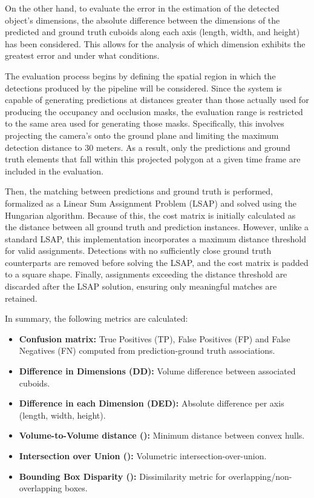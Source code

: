 On the other hand, to evaluate the error in the estimation of the detected object's dimensions, the absolute difference between the dimensions of the predicted and ground truth cuboids along each axis (length, width, and height) has been considered. This allows for the analysis of which dimension exhibits the greatest error and under what conditions.

The evaluation process begins by defining the spatial region in which the detections produced by the pipeline will be considered. Since the system is capable of generating predictions at distances greater than those actually used for producing the  occupancy and occlusion masks, the evaluation range is restricted to the same area used for generating those masks. Specifically, this involves projecting the camera's  onto the ground plane and limiting the maximum detection distance to $30$ meters. As a result, only the predictions and ground truth elements that fall within this projected polygon at a given time frame are included in the evaluation.

Then, the matching between predictions and ground truth is performed, formalized as a Linear Sum Assignment Problem (LSAP) and solved using the Hungarian algorithm. Because of this, the cost matrix is initially calculated as the  distance between all ground truth and prediction instances.  However, unlike a standard LSAP, this implementation incorporates a maximum distance threshold for valid assignments. Detections with no sufficiently close ground truth counterparts are removed before solving the LSAP, and the cost matrix is padded to a square shape. Finally, assignments exceeding the distance threshold are discarded after the LSAP solution, ensuring only meaningful matches are retained. 

In summary, the following metrics are calculated:
\begin{itemize}
    \item \textbf{Confusion matrix:} True Positives (TP), False Positives (FP) and False Negatives (FN) computed from prediction-ground truth associations.
    \item \textbf{Difference in Dimensions (DD):} Volume difference between associated cuboids.
    \item \textbf{Difference in each Dimension (DED):} Absolute difference per axis (length, width, height).  
    \item \textbf{Volume-to-Volume distance ():} Minimum distance between convex hulls.
    \item \textbf{Intersection over Union ():} Volumetric intersection-over-union.
    \item \textbf{Bounding Box Disparity ():} Dissimilarity metric for overlapping/non-overlapping boxes.
\end{itemize}

